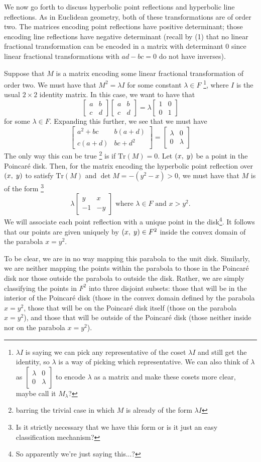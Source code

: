 \documentclass[12pt]{article}
\newcommand{\poincare}{Poincar\'{e} }
\newcommand{\Tr}{\text{Tr}}
\newcommand{\ttc}{, \hspace{1mm}}
\newcommand{\lftmat}[4]{\begin{bmatrix} {#1} & {#2} \\ {#3} & {#4} \end{bmatrix}}
\newcommand{\stanlftmat}{\lftmat{a}{b}{c}{d}}
\newcommand{\pointmat}[2]{\lftmat{{#2}}{{#1}}{-1}{-{#2}}}
\newcommand{\stanpointmat}{\pointmat{x}{y}}
\theoremstyle{plain}
\theoremstyle{definition}
\begin{document}
We now go forth to discuss hyperbolic point reflections and hyperbolic line reflections. As in Euclidean geometry, both of these transformations are of order two. The matrices encoding point reflections have positive determinant; those encoding line reflections have negative determinant (recall by (1) that no linear fractional transformation can be encoded in a matrix with determinant 0 since linear fractional transformations with $ad - bc = 0$ do not have inverses). 

Suppose that $M$ is a matrix encoding some linear fractional transformation of order two. We must have that $M^2 = \lambda I$ for some constant $\lambda \in F$ \footnote{$\lambda I$ is saying we can pick any representative of the coset $\lambda I$ and still get the identity, so $\lambda$ is a way of picking which representative. We can also think of $\lambda$ as $\lftmat{\lambda}{0}{0}{\lambda}$ to encode $\lambda$ as a matrix and make these cosets more clear, maybe call it $M_\lambda$?}, where $I$ is the usual $2 \times 2$ identity matrix. In this case, we want to have that 
	\[
		\stanlftmat \stanlftmat = \lambda \lftmat{1}{0}{0}{1}
	\]
for some $\lambda \in F$. Expanding this further, we see that we must have 
	\[
		\lftmat{a^2 + bc}{b(a+d)}{c(a+d)}{bc+d^2} =  \lftmat{\lambda}{0}{0}{\lambda}
	\]
The only way this can be true \footnote{barring the trivial case in which $M$ is already of the form $\lambda I$} is if $\Tr(M) = 0$. Let $(x \ttc y)$ be a point in the \poincare disk. Then, for the matrix encoding the hyperbolic point reflection over $(x \ttc y)$ to satisfy $\Tr(M)$ and $\det M = -(y^2 - x) > 0$, we must have that $M$ is of the form \footnote{Is it strictly necessary that we have this form or is it just an easy classification mechanism?} 
\begin{equation} 
	\lambda \stanpointmat \text{ where } \lambda \in F \text{ and } x > y^2. 
\end{equation}	
We will associate each point reflection with a unique point in the disk\footnote{So apparently we're just saying this...?}. It follows that our points are given uniquely by $(x \ttc y) \in F^2$ inside the convex domain of the parabola $x = y^2$.

To be clear, we are in no way mapping this parabola to the unit disk. Similarly, we are neither mapping the points within the parabola to those in the \poincare disk nor those outside the parabola to outside the disk. Rather, we are simply classifying the points in $F^2$ into three disjoint subsets: those that will be in the interior of the \poincare disk (those in the convex domain defined by the parabola $x = y^2$, those that will be on the \poincare disk itself (those on the parabola $x = y^2$), and those that will be outside of the \poincare disk (those neither inside nor on the parabola $x = y^2$). 
\end{document}
